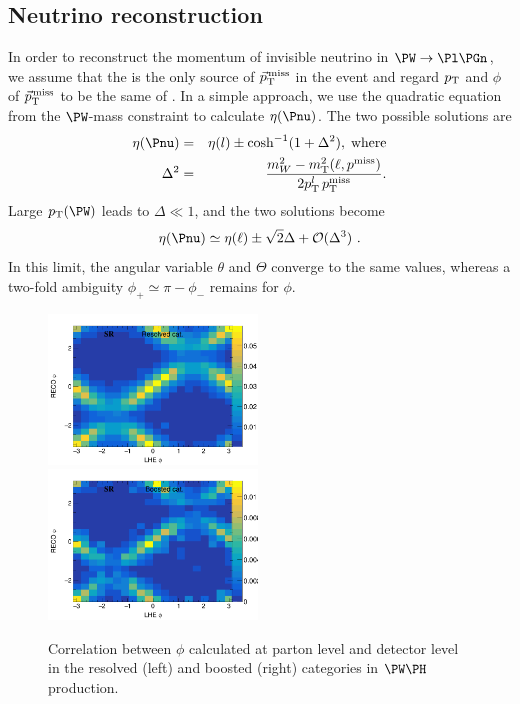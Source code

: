 \documentclass[a4paper,11pt]{article}
\begin{document}
\subsection{Neutrino reconstruction}
\label{sec:neu_reco}

In order to reconstruct the momentum of invisible neutrino in $\PW\rightarrow\Pl\Pgn$, we assume that the \Pnu is the only source of ${\vec p}_{\mathrm{T}}^{\kern1pt\text{miss}}$ in the event and regard $p_{\mathrm{T}}$ and $\phi$ of ${\vec p}_{\mathrm{T}}^{\kern1pt\text{miss}}$ to be the same of \Pnu. 
In a simple approach, we use the quadratic equation from the $\PW$-mass constraint to calculate $\eta(\Pnu)$. 
The two possible solutions are
\begin{eqnarray}
\eta(\Pnu) &=& {\eta}(l) \pm \cosh^{-1}(1+{\Delta}^2),\;\textrm{where}\label{Eq:NeuEta}\\
{\Delta}^2 &=& \frac{m_W^2 - m_\textrm{T}^2 (\ell,{p^\text{miss}\xspace})}{2 p_\textrm{T}^{l}\, p_\textrm{T}^\textrm{miss}}. 
\end{eqnarray}
Large $\pt(\PW)$ leads to $\Delta \ll 1$, and the two solutions become 
\begin{equation}
{\eta}(\Pnu) \simeq {\eta}(\ell) \pm \sqrt{2}{\Delta} + {\cal{O}} ({\Delta}^3)	\ .
\label{Eq:NeuEta2}
\end{equation}
In this limit,  the angular variable $\theta$ and $\Theta$ converge to the same values, whereas a two-fold ambiguity  $\phi_{+} \simeq \pi - \phi_{-}$ remains for $\phi$. 
\begin{figure}[hbtp]
\begin{center}
\includegraphics[width=0.495\textwidth]{Figures/RECO/Resolved_Plot_2D_phi_unweighted.png}
\includegraphics[width=0.495\textwidth]{Figures/RECO/Boosted_Plot_2D_phi_unweighted.png}
\end{center}
\caption{
Correlation between $\phi$ calculated at parton level and detector level in the resolved (left) and boosted (right) categories in $\PW\PH$ production.
}
\label{fig:neureco}
\end{figure}
\end{document}
